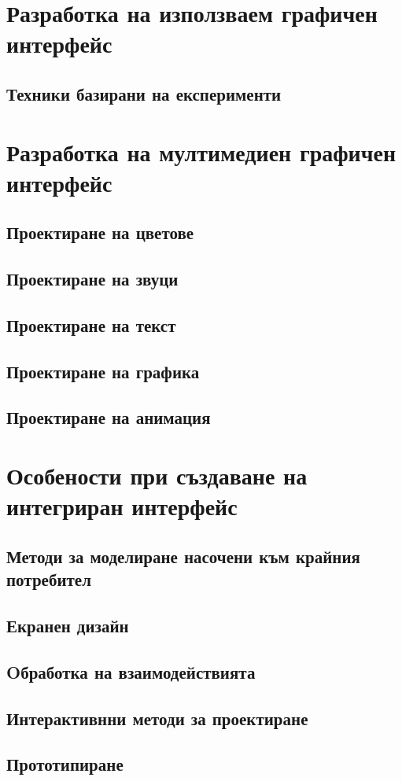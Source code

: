 \documentclass[fleqn,12pt]{article}
\begin{document}
\section{Разработка на използваем графичен интерфейс}

\subsection{Техники базирани на експерименти}

\section{Разработка на мултимедиен графичен интерфейс}

\subsection{Проектиране на цветове}
\subsection{Проектиране на звуци}
\subsection{Проектиране на текст}
\subsection{Проектиране на графика}
\subsection{Проектиране на анимация}

\section{Особености при създаване на интегриран интерфейс}

\subsection{Методи за моделиране насочени  към  крайния  потребител}
\subsection{Екранен  дизайн}
\subsection{Oбработка  на взаимодействията}
\subsection{Интерактивнни методи за проектиране}
\subsection{Прототипиране}
\end{document}
